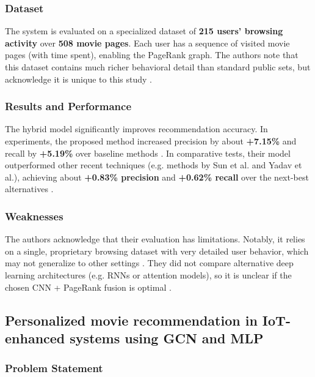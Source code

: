 \subsubsection{Dataset}

The system is evaluated on a specialized dataset of \textbf{215 users’ browsing activity} over \textbf{508 movie pages}. Each user has a sequence of visited movie pages (with time spent), enabling the PageRank graph. The authors note that this dataset contains much richer behavioral detail than standard public sets, but acknowledge it is unique to this study \cite{gao2025user}.



\subsubsection{Results and Performance}

The hybrid model significantly improves recommendation accuracy. In experiments, the proposed method increased precision by about \textbf{+7.15\%} and recall by \textbf{+5.19\%} over baseline methods \cite{gao2025user}. In comparative tests, their model outperformed other recent techniques (e.g. methods by Sun et al. and Yadav et al.), achieving about \textbf{+0.83\% precision} and \textbf{+0.62\% recall} over the next-best alternatives \cite{gao2025user}.



\subsubsection{Weaknesses}

The authors acknowledge that their evaluation has limitations. Notably, it relies on a single, proprietary browsing dataset with very detailed user behavior, which may not generalize to other settings \cite{gao2025user}. They did not compare alternative deep learning architectures (e.g. RNNs or attention models), so it is unclear if the chosen CNN + PageRank fusion is optimal \cite{gao2025user}.



\subsection{Personalized movie recommendation in IoT-enhanced systems using GCN and MLP}

\subsubsection{Problem Statement}

